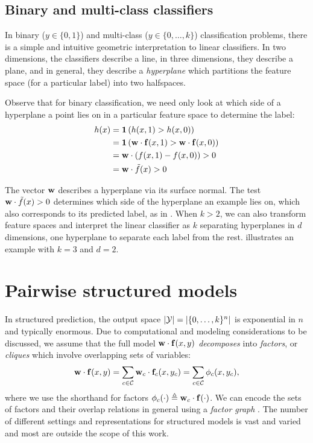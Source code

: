 \subsection{Binary and multi-class classifiers}
\label{sec:binary-multi-class}
In binary ($y \in \{0,1\}$) and multi-class ($y \in \{0,\ldots,k\}$) 
classification problems, there is a simple and intuitive geometric 
interpretation to linear classifiers.  In two dimensions, the classifiers 
describe a line, in three dimensions, they describe a plane, and in general, 
they describe a {\em hyperplane} which partitions the feature space (for a 
particular label) into two halfspaces.  

Observe that for binary classification, we need only look at which side of a 
hyperplane a point lies on in a particular feature space to determine the 
label:
\begin{align}
h(x) &= \mathbf{1}\left( h(x,1) > h(x,0)\right) \\
&= \mathbf{1}\left( \mathbf{w} \cdot \mathbf{f}(x,1) > \mathbf{w} \cdot \mathbf{f}(x,0) \right) \\
&= \mathbf{w} \cdot \left(f(x,1) - f(x,0)\right)  > 0\\ 
&= \mathbf{w} \cdot \tilde{f}(x) > 0 
\end{align}

The vector $\mathbf{w}$ describes a hyperplane via its surface normal.  The test $\mathbf{w} 
\cdot \tilde{f}(x) > 0$ determines which side of the hyperplane an example lies 
on, which also corresponds to its predicted label, as 
in .  When $k > 2$, we can also transform 
feature spaces and interpret the linear classifier as $k$ separating 
hyperplanes in $d$ dimensions, one hyperplane to separate each label from the 
rest.   illustrates an example with $k = 
3$ and $d = 2$.

\section{Pairwise structured models}
\label{sec:mrfs}
In structured prediction, the output space $|\mathcal{Y}| = |\{0,\ldots,k\}^n|$ is 
exponential in $n$ and typically enormous. Due to computational and modeling 
considerations to be discussed, we assume that the full model $\mathbf{w} \cdot 
\mathbf{f}(x,y)$ {\em decomposes} into {\em factors}, or {\em cliques} which involve 
overlapping sets of variables:  \begin{equation}
\mathbf{w} \cdot \mathbf{f}(x,y) = \sum_{c \in \mathcal{C}} \mathbf{w}_c \cdot \mathbf{f}_c(x,y_c) = \sum_{c \in \mathcal{C}} 
\phi_c(x,y_c),
\end{equation}
where we use the shorthand for factors $\phi_c(\cdot) \triangleq \mathbf{w}_c \cdot 
\mathbf{f}(\cdot)$.
We can encode the sets of factors and their overlap relations in general using 
a {\em factor graph} \citep{koller-book}.  The number of different settings and 
representations for structured models is vast and varied and most are outside 
the scope of this work.  

